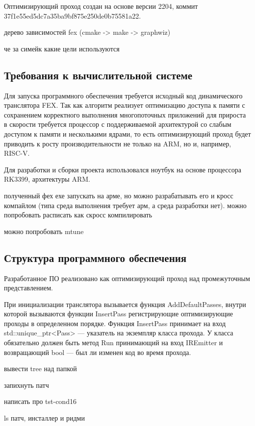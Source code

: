 Оптимизирующий проход создан на основе версии 2204, коммит \\ 37f1e55ed5dc7a35ba9bf875e250de0b75581a22.

дерево зависимостей fex (cmake -> make -> graphwiz)

че за симейк какие цели используются

\subsection{Требования к вычислительной системе}

Для запуска программного обеспечения требуется исходный код динамического транслятора FEX. Так как алгоритм реализует оптимизацию доступа к памяти с сохранением корректного выполнения многопоточных приложений для прироста в скорости требуется процессор с поддерживаемой архитектурой со слабым доступом к памяти и несколькими ядрами, то есть оптимизирующий проход будет приводить к росту производительности не только на ARM, но и, например, RISC-V.

Для разработки и сборки проекта использовался ноутбук на основе процессора RK3399, архитектуры ARM.

полученный фех ехе запускать на арме, но можно разрабатывать его и кросс компайлом (типа среда выполнения требует арм, а среда разработки нет). можно попробовать расписать как скросс компилировать

можно попробовать mtune

\subsection{Структура программного обеспечения}

Разработанное ПО реализовано как оптимизирующий проход над промежуточным представлением.

При инициализации транслятора вызывается функция AddDefaultPasses, внутри которой вызываются функции InsertPass регистрирующие оптимизирующие проходы в определенном порядке. Функция InsertPass принимает на вход std::unique\_ptr<Pass> --- указатель на экземпляр класса прохода. У класса обязательно должен быть метод Run принимающий на вход IREmitter и возвращающий bool --- был ли изменен код во время прохода.

вывести tree над папкой

запихнуть патч

написать про tst-cond16

ls патч, инсталлер и ридми

